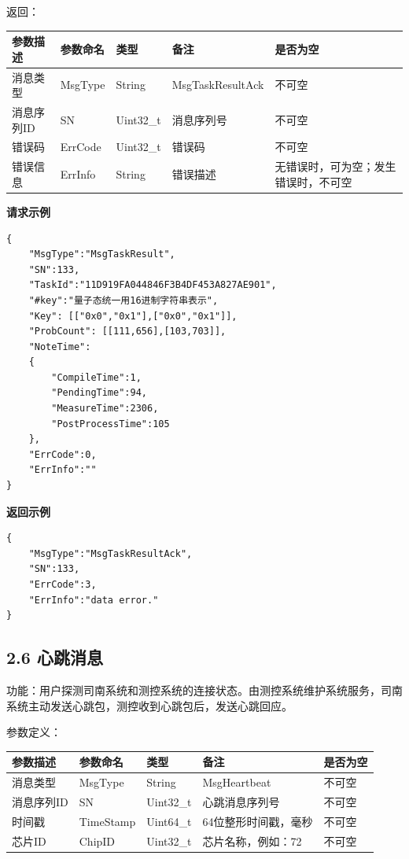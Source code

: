 \documentclass{ctexart}
\begin{document}
返回：

\begin{longtable}{|l|l|l|l|l|}
\hline
\textbf{\textbf{参数描述}} & \textbf{\textbf{参数命名}} & \textbf{\textbf{类型}} & \textbf{\textbf{备注}} & \textbf{\textbf{是否为空}} \\
\hline
消息类型 & MsgType & String & MsgTaskResultAck & 不可空 \\
消息序列ID & SN & Uint32_t & 消息序列号 & 不可空 \\
错误码 & ErrCode & Uint32_t & 错误码 & 不可空 \\
错误信息 & ErrInfo & String & 错误描述 & 无错误时，可为空；发生错误时，不可空 \\
\hline
\end{longtable}

\textbf{请求示例}

\begin{verbatim}{
    "MsgType":"MsgTaskResult",
    "SN":133,
    "TaskId":"11D919FA044846F3B4DF453A827AE901",
    "#key":"量子态统一用16进制字符串表示",
    "Key": [["0x0","0x1"],["0x0","0x1"]],
    "ProbCount": [[111,656],[103,703]],
    "NoteTime":
    {
        "CompileTime":1,
        "PendingTime":94,
        "MeasureTime":2306,
        "PostProcessTime":105
    },
    "ErrCode":0,
    "ErrInfo":""
}\end{verbatim}

\textbf{返回示例}

\begin{verbatim}{
    "MsgType":"MsgTaskResultAck",
    "SN":133,
    "ErrCode":3,
    "ErrInfo":"data error."
}\end{verbatim}

\subsection{2.6 心跳消息}

功能：用户探测司南系统和测控系统的连接状态。由测控系统维护系统服务，司南系统主动发送心跳包，测控收到心跳包后，发送心跳回应。

参数定义：

\begin{longtable}{|l|l|l|l|l|}
\hline
\textbf{\textbf{参数描述}} & \textbf{\textbf{参数命名}} & \textbf{\textbf{类型}} & \textbf{\textbf{备注}} & \textbf{\textbf{是否为空}} \\
\hline
消息类型 & MsgType & String & MsgHeartbeat & 不可空 \\
消息序列ID & SN & Uint32_t & 心跳消息序列号 & 不可空 \\
时间戳 & TimeStamp & Uint64_t & 64位整形时间戳，毫秒 & 不可空 \\
芯片ID & ChipID & Uint32_t & 芯片名称，例如：72 & 不可空 \\
\hline
\end{longtable}
\end{document}
